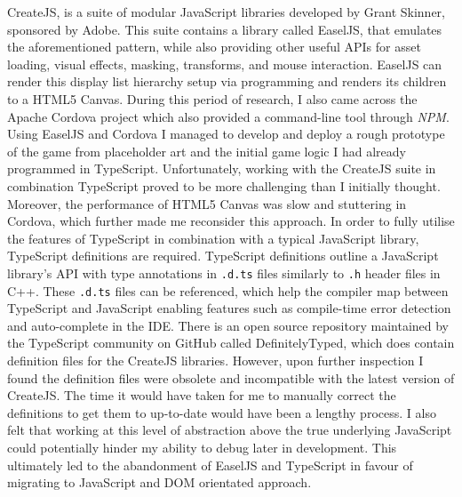 \documentclass[final]{cmpreport}
\begin{document}
CreateJS, is a suite of modular JavaScript libraries developed by Grant Skinner, sponsored by Adobe. This suite contains a library called EaselJS, that emulates the aforementioned pattern, while also providing other useful APIs for asset loading, visual effects, masking, transforms, and mouse interaction. EaselJS can render this display list hierarchy setup via programming and renders its children to a HTML5 Canvas. During this period of research, I also came across the Apache Cordova project which also provided a command-line tool through \textit{NPM}. Using EaselJS and Cordova I managed to develop and deploy a rough prototype of the game from placeholder art and the initial game logic I had already programmed in TypeScript. Unfortunately, working with the CreateJS suite in combination TypeScript proved to be more challenging than I initially thought. Moreover, the performance of HTML5 Canvas was slow and stuttering in Cordova, which further made me reconsider this approach. In order to fully utilise the features of TypeScript in combination with a typical JavaScript library, TypeScript definitions are required. TypeScript definitions outline a JavaScript library's API with type annotations in \texttt{.d.ts} files similarly to \texttt{.h} header files in C++. These \texttt{.d.ts} files can be referenced, which help the compiler map between TypeScript and JavaScript enabling features such as compile-time error detection and auto-complete in the IDE. There is an open source repository maintained by the TypeScript community on GitHub called DefinitelyTyped\footnotemark, which does contain definition files for the CreateJS libraries. However, upon further inspection I found the definition files were obsolete and incompatible with the latest version of CreateJS. The time it would have taken for me to manually correct the definitions to get them to up-to-date would have been a lengthy process. I also felt that working at this level of abstraction above the true underlying JavaScript could potentially hinder my ability to debug later in development. This ultimately led to the abandonment of EaselJS and TypeScript in favour of migrating to JavaScript and DOM orientated approach.
\end{document}
